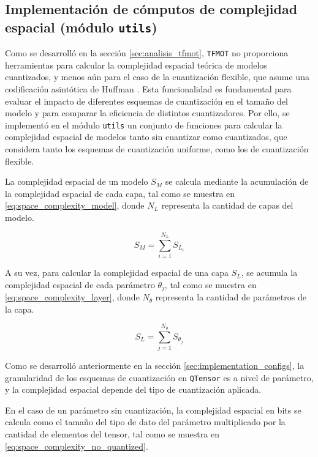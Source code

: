 \subsection{Implementación de cómputos de complejidad espacial (módulo \texttt{utils})}
\label{sec:implementation_evaluation}

Como se desarrolló en la sección \ref{sec:analisis_tfmot}, \texttt{TFMOT} no proporciona herramientas para calcular la complejidad espacial teórica de modelos cuantizados, y menos aún para el caso de la cuantización flexible, que asume una codificación asintótica de Huffman \cite{huffman1952method}. Esta funcionalidad es fundamental para evaluar el impacto de diferentes esquemas de cuantización en el tamaño del modelo y para comparar la eficiencia de distintos cuantizadores. Por ello, se implementó en el módulo \texttt{utils} un conjunto de funciones para calcular la complejidad espacial de modelos tanto sin cuantizar como cuantizados, que considera tanto los esquemas de cuantización uniforme, como los de cuantización flexible.

La complejidad espacial de un modelo $S_{M}$ se calcula mediante la acumulación de la complejidad espacial de cada capa, tal como se muestra en \eqref{eq:space_complexity_model}, donde $N_{L}$ representa la cantidad de capas del modelo.

\begin{equation}
  \label{eq:space_complexity_model}
  S_{M} = \sum_{i=1}^{N_{L}} S_{L_i}
\end{equation}

A su vez, para calcular la complejidad espacial de una capa $S_{L}$, se acumula la complejidad espacial de cada parámetro $\theta_j$, tal como se muestra en \eqref{eq:space_complexity_layer}, donde $N_{\theta}$ representa la cantidad de parámetros de la capa.

\begin{equation}
  \label{eq:space_complexity_layer}
  S_{L} = \sum_{j=1}^{N_{\theta}} S_{\theta_j}
\end{equation}

Como se desarrolló anteriormente en la sección \ref{sec:implementation_configs}, la granularidad de los esquemas de cuantización en \texttt{QTensor} es a nivel de parámetro, y la complejidad espacial depende del tipo de cuantización aplicada.

En el caso de un parámetro sin cuantización, la complejidad espacial en bits se calcula como el tamaño del tipo de dato del parámetro multiplicado por la cantidad de elementos del tensor, tal como se muestra en \eqref{eq:space_complexity_no_quantized}.

